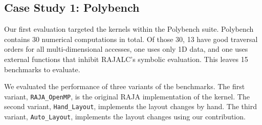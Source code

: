 \documentclass[sigconf, table]{acmart}
\begin{document}
\subsection{Case Study 1: Polybench}

Our first evaluation targeted the kernels within the Polybench suite. 
Polybench contains 30 numerical computations in total. 
Of those 30, 13 have good traversal orders for all multi-dimensional accesses, one uses only 1D data, and one uses external functions that inhibit RAJALC's symbolic evaluation.
This leaves 15 benchmarks to evaluate.

We evaluated the performance of three variants of the benchmarks.
The first variant, \verb.RAJA_OpenMP., is the original RAJA implementation of the kernel.
The second variant, \verb.Hand_Layout., implements the layout changes by hand.
The third variant, \verb.Auto_Layout., implements the layout changes using our contribution.
\end{document}
